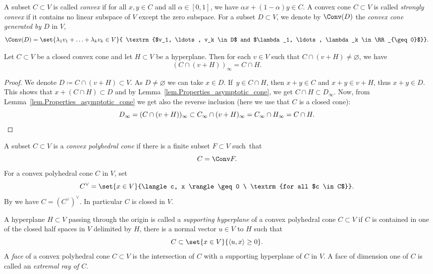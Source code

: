 A subset $C \subset V$ is called \emph{convex} if for all
$x, y \in C$ and all $\alpha \in [0, 1]$, we have $\alpha x + (1- \alpha) y \in C$.
A convex cone $C \subset V$ is called \emph{strongly convex} if
it contains no linear subspace of $V$ except the zero subspace.
For a
subset $D \subset V$, we denote by $\Conv(D)$ the
\emph{convex cone generated by $D$} in $V$, \ie
\[
\Conv(D) = \set{\lambda_1 v_1 + \ldots + \lambda_k v_k \in V}{
\textrm{$v_1, \ldots, v_k \in D$ and $\lambda_1, \ldots, \lambda_k \in \RR_{\geq 0}$}}.
\]

\begin{lemma}
\label{lem.Weights_facet_translated}
Let $C \subset V$ be a closed convex cone and let
$H \subset V$ be a hyperplane. Then for each $v \in V$ such that $C \cap (v+H) \neq \varnothing$, we have
\[
\left( C \cap (v+H) \right)_{\infty} = C \cap H.
\]
\end{lemma}

\begin{proof}
We denote $D \coloneqq C \cap (v+H) \subset V$. As
$D \neq \varnothing$ we can take $x \in D$. If~$y \in C \cap H$, then
$x+y \in C$ and $x+y \in v + H$, thus $x+y \in D$. This shows that
$x + (C \cap H) \subset D$ and by Lemma~\ref{lem.Properties_asymptotic_cone}, we get $C \cap H \subset D_\infty$.
Now, from Lemma~\ref{lem.Properties_asymptotic_cone} we get also the reverse inclusion
(here we use that $C$ is a closed cone):
\[
D_\infty = (C \cap (v+H))_\infty \subset C_\infty \cap (v+H)_\infty
= C_\infty \cap H_{\infty} = C \cap H.\qedhere
\]
\end{proof}

A subset $C\!\subset\!V$ is a \emph{convex polyhedral cone} if there is a finite subset
$F\!\subset\!V$ such~that
\[
C = \Conv F.
\]
For a convex polyhedral cone $C$ in $V$, set
\[
C^\vee = \set{x \in V}{\langle c, x \rangle\geq 0 \ \textrm{for all $c \in C$}}.
\]
By \cite[Propty\,(1), p.\,9]{Fu1993Introduction-to-to} we have $C = (C^\vee)^\vee$.
In particular $C$ is closed in $V$.

A hyperplane $H \subset V$ passing through the origin is called a \emph{supporting hyperplane} of a convex polyhedral cone
$C \subset V$ if
$C$ is contained in one of the closed half spaces in $V$
delimited by $H$, \ie there is a normal vector $u \in V$ to $H$
such that
\[
C \subset \set{x \in V}{\langle u, x \rangle\geq 0}.
\]
A \emph{face} of a convex polyhedral cone $C \subset V$ is the intersection of $C$ with a
supporting hyperplane of $C$ in $V$.
A face of dimension one of $C$ is called an \emph{extremal ray of $C$}.

